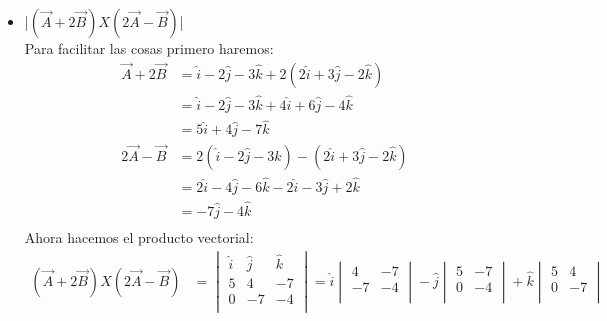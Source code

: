 \documentclass[12pt,openany]{book}
\begin{document}
\begin{itemize}
						\item |$(\vec{A}+2\vec{B})X(2\vec{A}-\vec{B})$|\\
							Para facilitar las cosas primero haremos:
								\begin{equation*}
								 	\begin{split}
								 		\vec{A}+2\vec{B}&=\hat{i}-2\hat{j}-3\hat{k}+2(2\hat{i}+3\hat{j}-2\hat{k})   \\
								 						&=\hat{i}-2\hat{j}-3\hat{k}+4\hat{i}+6\hat{j}-4\hat{k}		\\
								 						&=5\hat{i}+4\hat{j}-7\hat{k}								\\
								 		2\vec{A}-\vec{B}&=2(\hat{i}-2\hat{j}-3\hat{k})-(2\hat{i}+3\hat{j}-2\hat{k})  \\
								 						&=2\hat{i}-4\hat{j}-6\hat{k}-2\hat{i}-3\hat{j}+2\hat{k}		 \\
								 						&=-7\hat{j}-4\hat{k}		 \\
								 	\end{split}
								 \end{equation*}
								Ahora hacemos el producto vectorial:
								\begin{equation*}
									\begin{split}
										(\vec{A}+2\vec{B})X(2\vec{A}-\vec{B})&=\begin{vmatrix}
											 									\hat{i} & \hat{j} & \hat{k} \\
											 									   5    &   4    &    -7   \\
											 									   0    &  -7    &    -4   \\    
											 									\end{vmatrix}
											 									=\hat{i} \begin{vmatrix}
											 	    										 4 & -7 \\
											 	    										-7 & -4 \\
											 	    									\end{vmatrix}
											 	    							-\hat{j}\begin{vmatrix}
											 	    										5 & -7 \\
											 	    										0 & -4 \\
											 	    									\end{vmatrix}
											 	    						   +\hat{k}\begin{vmatrix}
											 	    										5 & 4 \\
											 	    										0 & -7 \\

\end{vmatrix}
\end{split}
\end{equation*}
\end{itemize}
\end{document}
